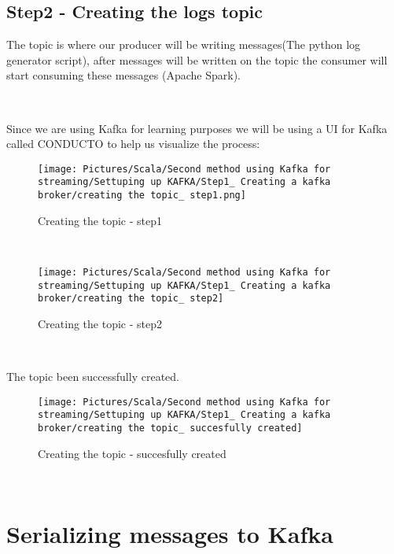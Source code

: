 \begin{spacing}{1.2}
\subsection{Step2 - Creating the logs topic}


\par The topic is where our producer will be writing messages(The python log generator script), after messages will be written on the topic the consumer will start consuming these messages (Apache Spark).


\\
\par
Since we are using Kafka for learning purposes we will be using a UI for Kafka called CONDUCTO to help us visualize the process:
\\
\begin{figure}[!htb] 
\begin{center} 
\texttt{[image: Pictures/Scala/Second method using Kafka for streaming/Settuping up KAFKA/Step1\_ Creating a kafka broker/creating the topic\_ step1.png]} 
\end{center} 
\caption{Creating the topic - step1} 
\end{figure}  \FloatBarrier
\\

\begin{figure}[!htb] 
\begin{center} 
\texttt{[image: Pictures/Scala/Second method using Kafka for streaming/Settuping up KAFKA/Step1\_ Creating a kafka broker/creating the topic\_ step2]} 
\end{center} 
\caption{Creating the topic - step2} 
\end{figure}  \FloatBarrier
\\

\par The topic been successfully created.
\\
\begin{figure}[!htb] 
\begin{center} 
\texttt{[image: Pictures/Scala/Second method using Kafka for streaming/Settuping up KAFKA/Step1\_ Creating a kafka broker/creating the topic\_ succesfully created]} 
\end{center} 
\caption{Creating the topic - succesfully created} 
\end{figure}  \FloatBarrier
\\



\section{Serializing messages to Kafka }


\end{spacing}
